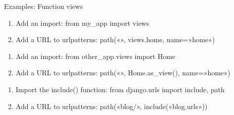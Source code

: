 \documentclass[letterpaper,11pt,polish]{sphinxmanual}
\begin{document}
\sphinxAtStartPar
Examples:
Function views
\begin{enumerate}
%
\item {} 
\sphinxAtStartPar
Add an import:  from my\_app import views

\item {} 
\sphinxAtStartPar
Add a URL to urlpatterns:  path(«», views.home, name=»home»)

\end{enumerate}
\begin{description}
\begin{enumerate}
%
\item {} 
\sphinxAtStartPar
Add an import:  from other\_app.views import Home

\item {} 
\sphinxAtStartPar
Add a URL to urlpatterns:  path(«», Home.as\_view(), name=»home»)

\end{enumerate}

\begin{enumerate}
%
\item {} 
\sphinxAtStartPar
Import the include() function: from django.urls import include, path

\item {} 
\sphinxAtStartPar
Add a URL to urlpatterns:  path(«blog/», include(«blog.urls»))

\end{enumerate}

\end{description}
\end{document}
